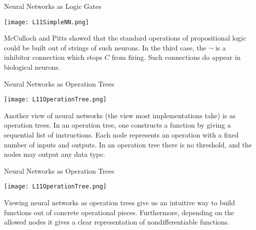 \documentclass[10pt, table, dvipsnames,xcdraw, handout]{beamer}
\begin{document}
\begin{frame}[fragile]{Neural Networks as Logic Gates}
  \begin{minipage}[t][0.5\textheight][t]{\textwidth}
	\centering \texttt{[image: L11SimpleNN.png]} 
  \end{minipage}
  \vfill
\begin{minipage}[t][0.5\textheight][t]{\textwidth}
McCulloch and Pitts showed that the standard operations of propositional logic could be built out of strings of such neurons. In the third case, the $\neg$ is a inhibitor connection which stops $C$ from firing. Such connections do appear in biological neurons. 
\end{minipage}
\end{frame}



\begin{frame}[fragile]{Neural Networks as Operation Trees}
  \begin{minipage}[t][0.5\textheight][t]{\textwidth}
	\centering \texttt{[image: L11OperationTree.png]} 
  \end{minipage}
  \vfill
\begin{minipage}[t][0.5\textheight][t]{\textwidth}
Another view of neural networks (the view most implementations take) is as operation trees. In an operation tree, one constructs a function by giving a sequential list of instructions. Each node represents an operation with a fixed number of inputs and outputs. \pause In an operation tree there is no threshold, and the nodes may output any data type. 
\end{minipage}
\end{frame}



\begin{frame}[fragile]{Neural Networks as Operation Trees}
  \begin{minipage}[t][0.5\textheight][t]{\textwidth}
	\centering \texttt{[image: L11OperationTree.png]} 
  \end{minipage}
  \vfill
\begin{minipage}[t][0.5\textheight][t]{\textwidth}
Viewing neural networks as operation trees give us an intuitive way to build functions out of concrete operational pieces. Furthermore, depending on the allowed nodes it gives a clear representation of nondifferentiable functions.
\end{minipage}
\end{frame}
\end{document}

